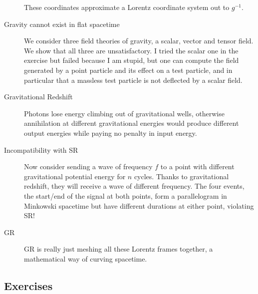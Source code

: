 \documentclass[12pt]{report}
\begin{document}
\begin{description}
        These coordinates approximate a Lorentz coordinate system out to
        $g^{-1}$.

    \item[Gravity cannot exist in flat spacetime] We consider three field
        theories of gravity, a scalar, vector and tensor field. We show that all
        three are unsatisfactory. I tried the scalar one in the exercise but
        failed because I am stupid, but one can compute the field generated by a
        point particle and its effect on a test particle, and in particular that
        a massless test particle is not deflected by a scalar field.

    \item[Gravitational Redshift] Photons lose energy climbing out of
        gravitational wells, otherwise annihilation at different gravitational
        energies would produce different output energies while paying no penalty
        in input energy.

    \item[Incompatibility with SR] Now consider sending a wave of frequency $f$
        to a point with different gravitational potential energy for $n$ cycles.
        Thanks to gravitational redshift, they will receive a wave of different
        frequency. The four events, the start/end of the signal at both points,
        form a parallelogram in Minkowski spacetime but have different durations
        at either point, violating SR\@!

    \item[GR] GR is really just meshing all these Lorentz frames together, a
        mathematical way of curving spacetime.
\end{description}

\subsection{Exercises}
\end{document}
